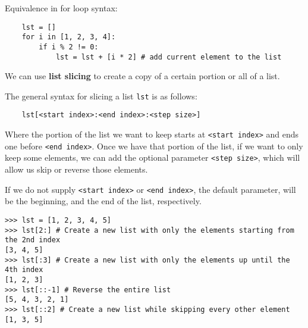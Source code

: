 Equivalence in for loop syntax:

\begin{lstlisting}
	lst = []
	for i in [1, 2, 3, 4]:
		if i % 2 != 0:
			lst = lst + [i * 2] # add current element to the list
\end{lstlisting}

We can use \textbf{list slicing} to create a copy of a certain portion or all of a list.

The general syntax for slicing a list \lstinline{lst} is as follows:

\begin{lstlisting}
	lst[<start index>:<end index>:<step size>]
\end{lstlisting}

Where the portion of the list we want to keep starts at \lstinline{<start index>} and ends one before
\lstinline{<end index>}. Once we have that portion of the list, if we want to only keep some elements, we can
add the optional parameter \lstinline{<step size>}, which will allow us skip or reverse those elements.

If we do not supply \lstinline{<start index>} or \lstinline{<end index>}, the default parameter, will be the
beginning, and the end of the list, respectively. 

\begin{lstlisting}
>>> lst = [1, 2, 3, 4, 5]
>>> lst[2:] # Create a new list with only the elements starting from the 2nd index
[3, 4, 5]
>>> lst[:3] # Create a new list with only the elements up until the 4th index
[1, 2, 3]
>>> lst[::-1] # Reverse the entire list
[5, 4, 3, 2, 1]
>>> lst[::2] # Create a new list while skipping every other element
[1, 3, 5]
\end{lstlisting}

